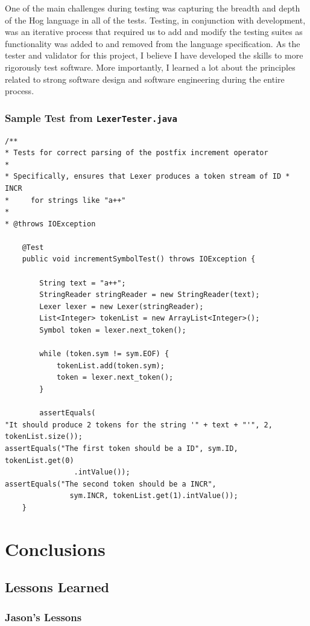 \documentclass{book}
\begin{document}
One of the main challenges during testing was capturing the breadth and depth of the Hog language in all of the tests. Testing, in conjunction with development, was an iterative process that required us to add and modify the testing suites as functionality was added to and removed from the language specification. As the tester and validator for this project, I believe I have developed the skills to more rigorously test software. More importantly, I learned a lot about the principles related to strong software design and software engineering during the entire process. 

\subsection*{Sample Test from \tt LexerTester.java\rm}

\begin{verbatim}
/**
* Tests for correct parsing of the postfix increment operator
* 
* Specifically, ensures that Lexer produces a token stream of ID * INCR 
*     for strings like "a++"
* 
* @throws IOException

	@Test
	public void incrementSymbolTest() throws IOException {

		String text = "a++";
		StringReader stringReader = new StringReader(text);
		Lexer lexer = new Lexer(stringReader);
		List<Integer> tokenList = new ArrayList<Integer>();
		Symbol token = lexer.next_token();

		while (token.sym != sym.EOF) {
			tokenList.add(token.sym);
			token = lexer.next_token();
		}

		assertEquals(
"It should produce 2 tokens for the string '" + text + "'", 2, tokenList.size());
assertEquals("The first token should be a ID", sym.ID, tokenList.get(0)
				.intValue());
assertEquals("The second token should be a INCR", 
               sym.INCR, tokenList.get(1).intValue());
	}
\end{verbatim}

\chapter{Conclusions}
\label{chap:concl}

\section{Lessons Learned}
\label{sec:lessons}



\subsection{Jason's Lessons}
\label{sub:jasons-lessons}
\end{document}
